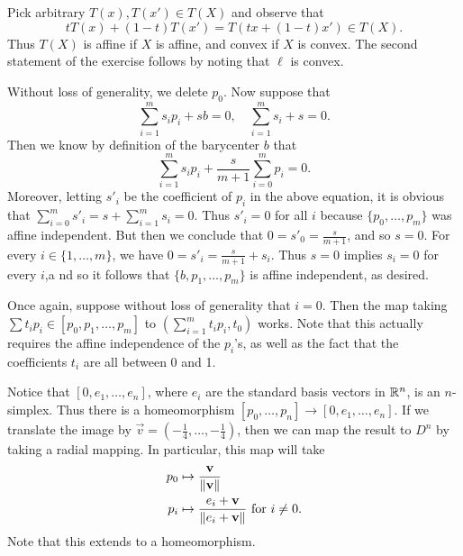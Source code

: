 \documentclass[../../solutions.tex]{subfiles}
\begin{document}
\begin{exercise} \leavevmode
Pick arbitrary $T(x),T(x')\in T(X)$ and observe that \[tT(x)+(1-t)T(x')=T(tx+(1-t)x')\in T(X).\] Thus $T(X)$ is affine if $X$ is affine, and convex if $X$ is convex. The second statement of the exercise follows by noting that $\ell$ is convex. 
\end{exercise} 

\begin{exercise} \leavevmode
Without loss of generality, we delete $p_0$. Now suppose that \[\sum_{i=1}^ms_ip_i+sb=0,\quad\sum_{i=1}^ms_i+s=0.\] Then we know by definition of the barycenter $b$ that \[\sum_{i=1}^ms_ip_i+\frac s{m+1}\sum_{i=0}^mp_i=0.\] Moreover, letting $s'_i$ be the coefficient of $p_i$ in the above equation, it is obvious that $\sum_{i=0}^ms'_i=s+\sum_{i=1}^ms_i=0$. Thus $s'_i=0$ for all $i$ because $\{p_0,\dots,p_m\}$ was affine independent. But then we conclude that $0=s'_0=\frac s{m+1}$, and so $s=0$. For every $i\in\{1,\dots,m\}$, we have $0=s'_i=\frac s{m+1}+s_i$. Thus $s=0$ implies $s_i=0$ for every $i$,a nd so it follows that $\{b,p_1,\dots,p_m\}$ is affine independent, as desired.
\end{exercise} 

\begin{exercise} \leavevmode
Once again, suppose without loss of generality that $i=0$. Then the map taking $\sum t_ip_i\in[p_0,p_1,\dots,p_m]$ to $\left(\sum_{i=1}^mt_ip_i,t_0\right)$ works. Note that this actually requires the affine independence of the $p_i$'s, as well as the fact that the coefficients $t_i$ are all between 0 and 1. 
\end{exercise} 

\begin{exercise} \leavevmode
Notice that $[0,e_1,\dots,e_n]$, where $e_i$ are the standard basis vectors in $\mathbb{R}^n$, is an $n$-simplex. Thus there is a homeomorphism $[p_0,\dots,p_n]\to[0,e_1,\dots,e_n]$. If we translate the image by $\vec v=(-\frac14,\dots,-\frac14)$, then we can map the result to $D^n$ by taking a radial mapping. In particular, this map will take \begin{align*}p_0&\mapsto\frac{\mathbf v}{\lVert\mathbf v\rVert}\\p_i&\mapsto\frac{e_i+\mathbf v}{\lVert e_i+\mathbf v\rVert}~\text{for}~i\ne0.\end{align*} Note that this extends to a homeomorphism. 
\end{exercise}
\end{document}
